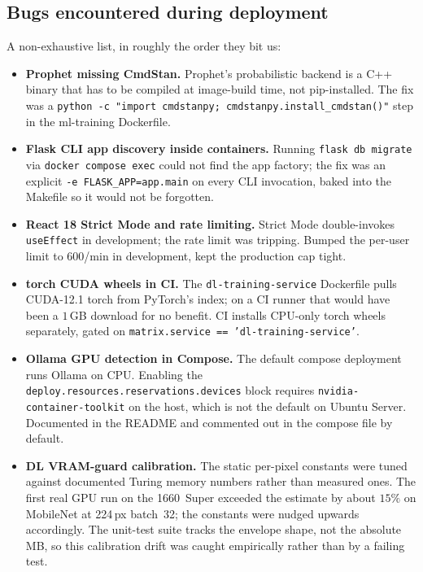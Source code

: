 \documentclass[12pt, a4paper, oneside]{report}
\begin{document}
\subsection{Bugs encountered during deployment}

A non-exhaustive list, in roughly the order they bit us:

\begin{itemize}
    \item \textbf{Prophet missing CmdStan.} Prophet's probabilistic
        backend is a C++ binary that has to be compiled at
        image-build time, not pip-installed. The fix was a
        \texttt{python -c "import\,cmdstanpy;\,cmdstanpy.install\_cmdstan()"}
        step in the ml-training Dockerfile.
    \item \textbf{Flask CLI app discovery inside containers.}
        Running \texttt{flask db migrate} via \texttt{docker compose
        exec} could not find the app factory; the fix was an
        explicit \texttt{-e FLASK\_APP=app.main} on every CLI
        invocation, baked into the Makefile so it would not be
        forgotten.
    \item \textbf{React 18 Strict Mode and rate limiting.} Strict
        Mode double-invokes \texttt{useEffect} in development; the
        rate limit was tripping. Bumped the per-user limit to
        $600$/min in development, kept the production cap tight.
    \item \textbf{torch CUDA wheels in CI.} The
        \texttt{dl-training-service} Dockerfile pulls CUDA-12.1
        torch from PyTorch's index; on a CI runner that would have
        been a $1$\,GB download for no benefit. CI installs
        CPU-only torch wheels separately, gated on
        \texttt{matrix.service == 'dl-training-service'}.
    \item \textbf{Ollama GPU detection in Compose.} The default
        compose deployment runs Ollama on CPU. Enabling the
        \texttt{deploy.resources.reservations.devices} block
        requires \texttt{nvidia-container-toolkit} on the host,
        which is not the default on Ubuntu Server. Documented in
        the README and commented out in the compose file by
        default.
    \item \textbf{DL VRAM-guard calibration.} The static per-pixel
        constants were tuned against documented Turing memory
        numbers rather than measured ones. The first real GPU run
        on the 1660~Super exceeded the estimate by about $15\%$ on
        MobileNet at 224\,px batch~32; the constants were nudged
        upwards accordingly. The unit-test suite tracks the
        envelope shape, not the absolute MB, so this calibration
        drift was caught empirically rather than by a failing
        test.
\end{itemize}
\end{document}
